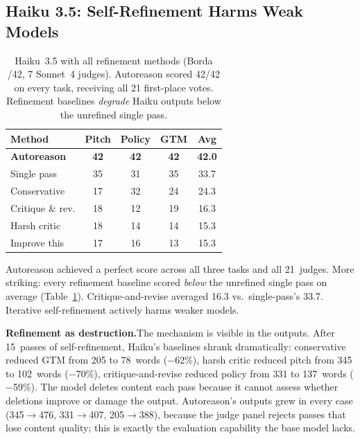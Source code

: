 \documentclass[11pt]{article}
\begin{document}
\subsection{Haiku 3.5: Self-Refinement Harms Weak Models}

\begin{table}[H]
\centering
\small
\begin{tabular}{@{}lcccc@{}}
\toprule
\textbf{Method} & \textbf{Pitch} & \textbf{Policy} & \textbf{GTM} & \textbf{Avg} \\
\midrule
\rowcolor{TableShade}
\textbf{Autoreason} & \textbf{42} & \textbf{42} & \textbf{42} & \textbf{42.0} \\
Single pass & 35 & 31 & 35 & 33.7 \\
\rowcolor{TableShade}
Conservative & 17 & 32 & 24 & 24.3 \\
Critique \& rev. & 18 & 12 & 19 & 16.3 \\
\rowcolor{TableShade}
Harsh critic & 18 & 14 & 14 & 15.3 \\
Improve this & 17 & 16 & 13 & 15.3 \\
\bottomrule
\end{tabular}
\caption{Haiku~3.5 with all refinement methods (Borda /42, 7 Sonnet~4 judges). Autoreason scored 42/42 on every task, receiving all 21 first-place votes. Refinement baselines \textit{degrade} Haiku outputs below the unrefined single pass.}
\label{tab:small_model}
\end{table}

Autoreason achieved a perfect score across all three tasks and all 21~judges. More striking: every refinement baseline scored \textit{below} the unrefined single pass on average (Table~\ref{tab:small_model}). Critique-and-revise averaged 16.3 vs.\ single-pass's 33.7. Iterative self-refinement actively harms weaker models.

\textbf{Refinement as destruction.}\enspace The mechanism is visible in the outputs. After 15~passes of self-refinement, Haiku's baselines shrank dramatically: conservative reduced GTM from 205 to 78~words ($-$62\%), harsh critic reduced pitch from 345 to 102~words ($-$70\%), critique-and-revise reduced policy from 331 to 137~words ($-$59\%). The model deletes content each pass because it cannot assess whether deletions improve or damage the output. Autoreason's outputs grew in every case (345$\to$476, 331$\to$407, 205$\to$388), because the judge panel rejects passes that lose content quality; this is exactly the evaluation capability the base model lacks.
\end{document}
